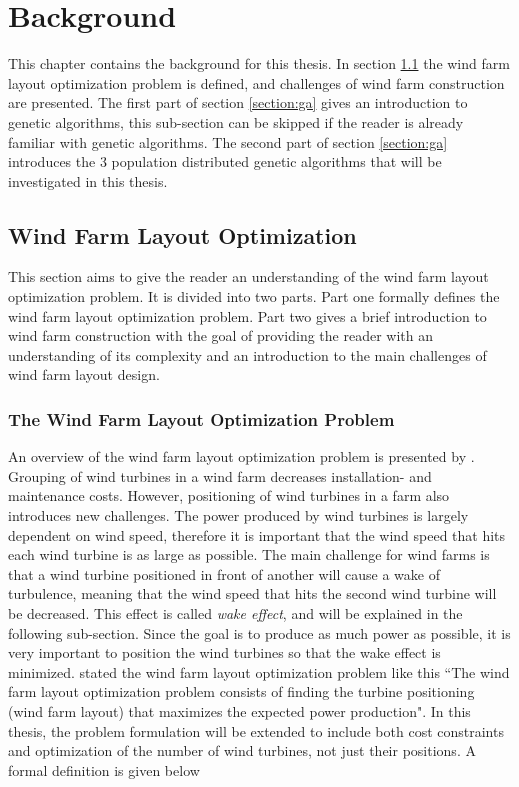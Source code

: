 \chapter{Background}\label{chapter:background}
This chapter contains the background for this thesis. In section \ref{section:wflo} the wind farm layout optimization problem is defined, and challenges of wind farm construction are presented. The first part of section \ref{section:ga} gives an introduction to genetic algorithms, this sub-section can be skipped if the reader is already familiar with genetic algorithms. The second part of section \ref{section:ga} introduces the 3 population distributed genetic algorithms that will be investigated in this thesis.


\section{Wind Farm Layout Optimization}\label{section:wflo}
This section aims to give the reader an understanding of the wind farm layout optimization problem. It is divided into two parts. Part one formally defines the wind farm layout optimization problem. Part two gives a brief introduction to wind farm construction with the goal of providing the reader with an understanding of its complexity and an introduction to the main challenges of wind farm layout design.


\subsection{The Wind Farm Layout Optimization Problem}
An overview of the wind farm layout optimization problem is presented by \cite{Samorani}. Grouping of wind turbines in a wind farm decreases installation- and maintenance costs. However, positioning of wind turbines in a farm also introduces new challenges. The power produced by wind turbines is largely dependent on wind speed, therefore it is important that the wind speed that hits each wind turbine is as large as possible. The main challenge for wind farms is that a wind turbine positioned in front of another will cause a wake of turbulence, meaning that the wind speed that hits the second wind turbine will be decreased. This effect is called \textit{wake effect}, and will be explained in the following sub-section. Since the goal is to produce as much power as possible, it is very important to position the wind turbines so that the wake effect is minimized. \cite{Samorani} stated the wind farm layout optimization problem like this ``The wind farm layout optimization problem consists of finding the turbine positioning (wind farm layout) that maximizes the expected power production". In this thesis, the problem formulation will be extended to include both cost constraints and optimization of the number of wind turbines, not just their positions. A formal definition is given below



